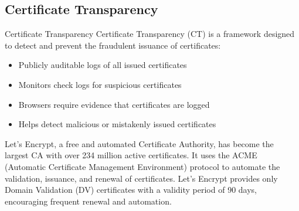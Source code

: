 \subsection{Certificate Transparency}

\begin{concept}{Certificate Transparency}
Certificate Transparency (CT) is a framework designed to detect and prevent the fraudulent issuance of certificates:
\begin{itemize}
    \item Publicly auditable logs of all issued certificates
    \item Monitors check logs for suspicious certificates
    \item Browsers require evidence that certificates are logged
    \item Helps detect malicious or mistakenly issued certificates
\end{itemize}
\end{concept}

\begin{example}
Let's Encrypt, a free and automated Certificate Authority, has become the largest CA with over 234 million active certificates. It uses the ACME (Automatic Certificate Management Environment) protocol to automate the validation, issuance, and renewal of certificates. Let's Encrypt provides only Domain Validation (DV) certificates with a validity period of 90 days, encouraging frequent renewal and automation.
\end{example}




